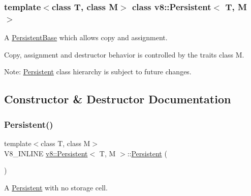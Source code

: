 \subsubsection*{template$<$class T, class M$>$\newline
class v8\+::\+Persistent$<$ T, M $>$}

A \mbox{\hyperlink{classv8_1_1PersistentBase}{Persistent\+Base}} which allows copy and assignment.

Copy, assignment and destructor behavior is controlled by the traits class M.

Note\+: \mbox{\hyperlink{classv8_1_1Persistent}{Persistent}} class hierarchy is subject to future changes. 

\subsection{Constructor \& Destructor Documentation}
\mbox{\label{classv8_1_1Persistent_a5ce14612215393683d814056015a102d}} 
\subsubsection{\texorpdfstring{Persistent()}{Persistent()}\hspace{0.1cm}{\footnotesize\ttfamily [1/4]}}
{\footnotesize\ttfamily template$<$class T, class M$>$ \\
V8\+\_\+\+I\+N\+L\+I\+NE \mbox{\hyperlink{classv8_1_1Persistent}{v8\+::\+Persistent}}$<$ T, M $>$\+::\mbox{\hyperlink{classv8_1_1Persistent}{Persistent}} (\begin{DoxyParamCaption}{ }\end{DoxyParamCaption})\hspace{0.3cm}{\ttfamily [inline]}}

A \mbox{\hyperlink{classv8_1_1Persistent}{Persistent}} with no storage cell. \mbox{\label{classv8_1_1Persistent_aabe9a42d7971bd31173bca34186d9ac2}} 
